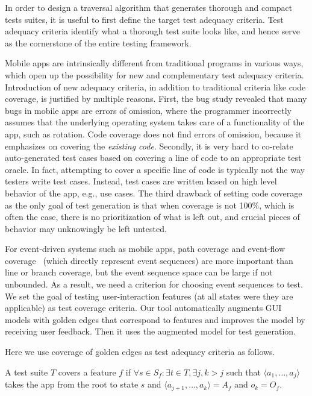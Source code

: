 

In order to design a traversal algorithm that generates thorough and compact tests suites, it is useful to first define the target test adequacy criteria. Test adequacy criteria identify what a thorough test suite looks like, and hence serve as the cornerstone of the entire testing framework.

Mobile apps are intrinsically different from traditional programs in various ways, which open up the possibility for new and complementary test adequacy criteria. Introduction of new adequacy criteria, in addition to traditional criteria like code coverage, is justified by multiple reasons. First, the bug study revealed that many bugs in mobile apps are errors of omission, where the programmer incorrectly assumes that the underlying operating system takes care of a functionality of the app, such as rotation. Code coverage does not find errors of omission, because it emphasizes on covering the \emph{existing code}. Secondly, it is very hard to co-relate auto-generated test cases based on covering a line of code to an appropriate test oracle. In fact, attempting to cover a specific line of code is typically not the way testers write test cases. Instead, test cases are written based on high level behavior of the app, e.g., use cases. The third drawback of setting code coverage as the only goal of test generation is that when coverage is not 100\%, which is often the case, there is no prioritization of what is left out, and crucial pieces of behavior may unknowingly be left untested. 

For event-driven systems such as mobile apps, path coverage and event-flow coverage~\cite{memon2001coverage} (which directly represent event sequences) are more important than line or branch coverage, but the event sequence space can be large if not unbounded. As a result, we need a criterion for choosing event sequences to test. We set the goal of testing user-interaction features (at all states were they are applicable) as test coverage criteria. Our tool automatically augments GUI models with golden edges that correspond to features and improves the model by receiving user feedback. Then it uses the augmented model for test generation.

 Here we use coverage of golden edges as test adequacy criteria as follows.

\begin{mydef}
\label{def:coverage}
A test suite $T$ covers a feature $f$ if $\forall s \in S_f: \exists t \in T, \exists j, k > j$ such that $\langle a_1, \dots, a_j \rangle$ takes the app from the root to state $s$ and $\langle a_{j+1}, \dots, a_k \rangle = A_f$ and $o_k = O_f$.
\end{mydef}